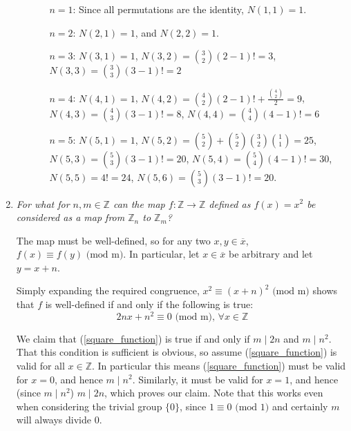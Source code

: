 \documentclass[letterpaper, 11pt]{article}
\begin{document}
\begin{enumerate}
\begin{enumerate}
\begin{enumerate}
\item[\underline{$n=1$}:]  Since all permutations are the identity, $N(1,1) = 1$.
\item[\underline{$n=2$}:]  $N(2,1) = 1$, and $N(2,2) = 1$.
\item[\underline{$n=3$}:]  $N(3,1) = 1$, $N(3,2) = \binom{3}{2}(2-1)! = 3$, $N(3,3) = \binom{3}{3}(3-1)! = 2$
\item[\underline{$n=4$}:]  $N(4,1) = 1$, $N(4,2) = \binom{4}{2}(2-1)! + \frac{\binom{4}{2}}{2} = 9$, $N(4,3) = \binom{4}{3}(3-1)! = 8$, $N(4,4) = \binom{4}{4}(4-1)! = 6$
\item[\underline{$n=5$}:] $N(5,1) = 1$, $N(5,2) = \binom{5}{2} + \binom{5}{2}\binom{3}{2}\binom{1}{1} = 25$, $N(5,3) = \binom{5}{3}(3-1)! = 20$, $N(5,4) = \binom{5}{4}(4-1)! = 30$, $N(5,5) = 4! = 24$, $N(5,6) = \binom{5}{3}(3-1)! = 20$.
\end{enumerate}

\end{enumerate}

\item \emph{For what for $n,m \in \mathbb{Z}$ can the map $f: \mathbb{Z} \rightarrow \mathbb{Z}$ defined as $f(x) = x^2$ be considered as a map from $\mathbb{Z}_n$ to $\mathbb{Z}_m$?}

The map must be well-defined, so for any two $x,y \in \overline{x}$, $f(x) \equiv f(y) \mbox{ (mod m)}$.  In particular, let $x \in \overline{x}$ be arbitrary and let $y = x+n$.

Simply expanding the required congruence, $x^2 \equiv (x+n)^2 \mbox{ (mod m)}$ shows that $f$ is well-defined if and only if the following is true:
\begin{equation}
\label{square_function}
2nx + n^2 \equiv 0 \mbox{ (mod m), } \forall x \in \mathbb{Z}
\end{equation}

We claim that (\ref{square_function}) is true if and only if $m \mid 2n$ and $m \mid n^2$.  That this condition is sufficient is obvious, so assume (\ref{square_function}) is valid for all $x \in \mathbb{Z}$.  In particular this means (\ref{square_function}) must be valid for $x=0$, and hence $m \mid n^2$.  Similarly, it must be valid for $x=1$, and hence (since $m \mid n^2$) $m \mid 2n$, which proves our claim.  Note that this works even when considering the trivial group $\{0\}$, since $1 \equiv 0 \mbox{ (mod 1)}$ and certainly $m$ will always divide $0$.
\end{enumerate} 
\end{document}
